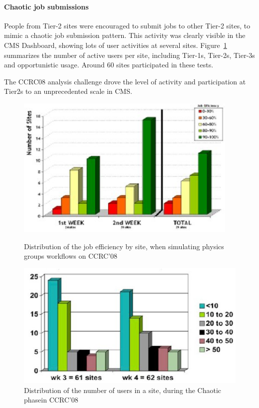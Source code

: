 \paragraph{Chaotic job submissions}
People from Tier-2 sites were encouraged to submit jobs to other Tier-2 sites, to mimic a chaotic job submission pattern. This activity was clearly visible in the CMS Dashboard, showing lots of user activities at several sites. Figure~\ref{fig:CCRC08Chaotic} summarizes the number of active users per site, including Tier-1s, Tier-2s, Tier-3s and opportunistic usage. Around 60 sites participated in these tests.

The CCRC08 analysis challenge drove the level of activity and participation at Tier2s to an unprecedented scale in CMS.

\begin{figure}
\centering
\begin{minipage}{.45\textwidth}
\centering
\includegraphics[width=0.95\textwidth]{CCRC08SiteEff.eps}
\caption{Distribution of the job efficiency by site, when simulating physics
groups workflows on CCRC’08}
\label{fig:CCRC08SiteEff}
\end{minipage}
\begin{minipage}{.45\textwidth}
\centering
\includegraphics[width=1.\textwidth]{CCRC08Chaotic.eps}
\caption{Distribution of the number of users in a site, during the Chaotic phasein CCRC’08}
\label{fig:CCRC08Chaotic}
\end{minipage}
\end{figure}

